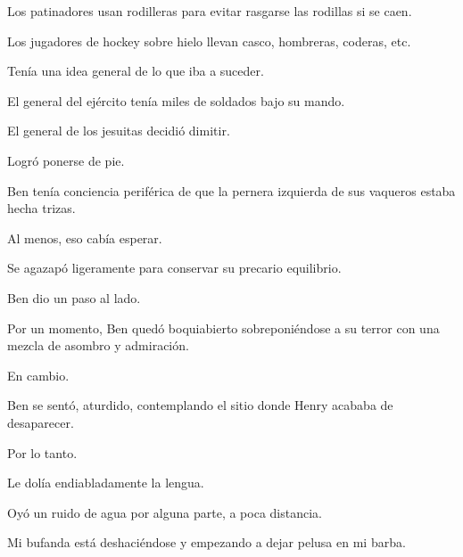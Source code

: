 \sk
Los patinadores usan rodilleras para evitar rasgarse las rodillas si se caen.

\sk
Los jugadores de hockey sobre hielo llevan casco, hombreras, coderas, etc.

\sk
Tenía una idea general de lo que iba a suceder.

\sk
El general del ejército tenía miles de soldados bajo su mando.

\sk
El general de los jesuitas decidió dimitir.

\sk
Logró ponerse de pie.

\sk
Ben tenía conciencia periférica de que la
pernera izquierda de sus vaqueros estaba hecha
trizas.

\sk
Al menos, eso cabía esperar.

\sk
Se agazapó ligeramente para conservar su
precario equilibrio.

\sk
Ben dio un paso al lado.

\sk
Por un momento, Ben quedó
boquiabierto sobreponiéndose a su terror con una
mezcla de asombro y admiración.

\sk
En cambio. 

\sk
Ben se sentó, aturdido, contemplando el sitio
donde Henry acababa de desaparecer.

\sk
Por lo tanto. 

\sk
Le dolía endiabladamente la lengua.

\sk
Oyó un ruido de agua por alguna parte, a poca distancia.

\sk
Mi bufanda está deshaciéndose y empezando a dejar pelusa en mi barba.

